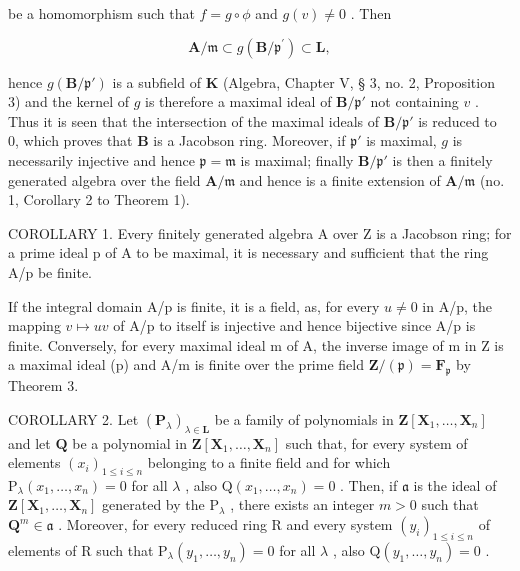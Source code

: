 be a homomorphism such that \(f = g \circ \phi\) and \(g(v) \neq 0\) . Then

\[
\mathbf {A} / \mathfrak {m} \subset g (\mathbf {B} / \mathfrak {p} ^ {\prime}) \subset \mathbf {L},
\]

hence \(g(\mathbf{B} / \mathfrak{p}')\) is a subfield of \(\mathbf{K}\) (Algebra, Chapter V, § 3, no. 2, Proposition 3) and the kernel of \(g\) is therefore a maximal ideal of \(\mathbf{B} / \mathfrak{p}'\) not containing \(v\) . Thus it is seen that the intersection of the maximal ideals of \(\mathbf{B} / \mathfrak{p}'\) is reduced to 0, which proves that \(\mathbf{B}\) is a Jacobson ring. Moreover, if \(\mathfrak{p}'\) is maximal, \(g\) is necessarily injective and hence \(\mathfrak{p} = \mathfrak{m}\) is maximal; finally \(\mathbf{B} / \mathfrak{p}'\) is then a finitely generated algebra over the field \(\mathbf{A} / \mathfrak{m}\) and hence is a finite extension of \(\mathbf{A} / \mathfrak{m}\) (no. 1, Corollary 2 to Theorem 1).

COROLLARY 1. Every finitely generated algebra A over Z is a Jacobson ring; for a prime ideal p of A to be maximal, it is necessary and sufficient that the ring A/p be finite.

If the integral domain A/p is finite, it is a field, as, for every \(u \neq 0\) in A/p, the mapping \(v \mapsto uv\) of A/p to itself is injective and hence bijective since A/p is finite. Conversely, for every maximal ideal m of A, the inverse image of m in Z is a maximal ideal (p) and A/m is finite over the prime field \(\mathbf{Z}/(\mathfrak{p}) = \mathbf{F}_{\mathfrak{p}}\) by Theorem 3.

COROLLARY 2. Let \((\mathbf{P}_{\lambda})_{\lambda \in \mathbf{L}}\) be a family of polynomials in \(\mathbf{Z}[\mathbf{X}_1,\ldots ,\mathbf{X}_n]\) and let \(\mathbf{Q}\) be a polynomial in \(\mathbf{Z}[\mathbf{X}_1,\dots ,\mathbf{X}_n]\) such that, for every system of elements \((x_i)_{1\leqslant i\leqslant n}\) belonging to a finite field and for which \(\mathrm{P}_{\lambda}(x_1,\ldots ,x_n) = 0\) for all \(\lambda\) , also \(\mathrm{Q}(x_1,\ldots ,x_n) = 0\) . Then, if \(\mathfrak{a}\) is the ideal of \(\mathbf{Z}[\mathbf{X}_1,\ldots ,\mathbf{X}_n]\) generated by the \(\mathrm{P}_{\lambda}\) , there exists an integer \(m > 0\) such that \(\mathbf{Q}^m\in \mathfrak{a}\) . Moreover, for every reduced ring R and every system \((y_i)_{1\leqslant i\leqslant n}\) of elements of R such that \(\mathrm{P}_{\lambda}(y_1,\ldots ,y_n) = 0\) for all \(\lambda\) , also \(\mathrm{Q}(y_1,\ldots ,y_n) = 0\) .

